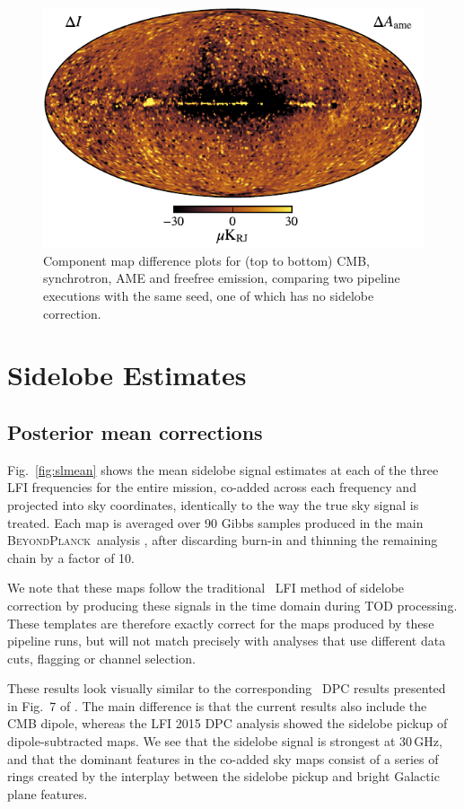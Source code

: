 \documentclass[twocolumn]{aa}
\newcommand{\BP}{\textsc{BeyondPlanck}}
\begin{document}
\begin{figure}[t]
  \includegraphics[width=0.95\linewidth]{figs/ame_diff.pdf}
  \caption{Component map difference plots for (top to bottom) CMB, synchrotron, AME and freefree emission, comparing two pipeline executions with the same seed, one of which has no sidelobe correction.
  }\label{fig:compdiff}
\end{figure}

\section{Sidelobe Estimates}
\subsection{Posterior mean corrections}

Fig.~\ref{fig:slmean} shows the mean sidelobe signal estimates at each of the three LFI frequencies for the entire mission, co-added across each frequency and projected into sky coordinates, identically to the way the true sky signal is treated. Each map is averaged over 90 Gibbs samples produced in the main \BP\ analysis \citep{BP01}, after discarding burn-in and thinning the remaining chain by a factor of 10.

We note that these maps follow the traditional \Planck\ LFI method of sidelobe correction by producing these signals in the time domain during TOD processing. These templates are therefore exactly correct for the maps produced by these pipeline runs, but will not match precisely with analyses that use different data cuts, flagging or channel selection.

These results look visually similar to the corresponding \Planck\ DPC results presented in Fig.~7 of \citet{planck2014-a04}. The main difference is that the current results also include the CMB dipole, whereas the LFI 2015 DPC analysis showed the sidelobe pickup of dipole-subtracted maps. We see that the sidelobe signal is strongest at 30\,GHz, and that the dominant features in the co-added sky maps consist of a series of rings created by the interplay between the sidelobe pickup and bright Galactic plane features. 
\end{document}
